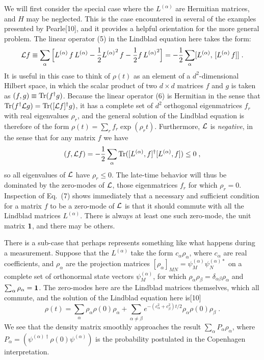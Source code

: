 We will first consider the special case where the $L^{(\alpha)}$ are Hermitian matrices, and $H$ may be neglected.  This is the case encountered in several of the examples presented by Pearle[10], and it provides a helpful orientation for the more general problem.  The linear operator (5) in the Lindblad equation here takes the form:
\begin{equation}
{\cal L}f\equiv \sum_\alpha \Big[L^{(\alpha)}\,f\,L^{(\alpha)}
-\frac{1}{2}{L^{(\alpha)}}^2\,f
-\frac{1}{2}f\,{L^{(\alpha)}}^2\Big]=-\frac{1}{2}\sum_\alpha[L^{(\alpha)},\,[L^{(\alpha)}\,f]]\;.
\end{equation}  
It is useful in this case to think of $ \rho(t)$ as an element of a $d^2$-dimensional Hilbert space, in which the scalar product of two $d\times d$ matrices $f$ and $g$ is taken as $(f,g)\equiv {\rm Tr}(f^\dagger g)$.  
Because the linear operator (6) is Hermitian in the sense that ${\rm Tr}(f^\dagger{\cal L} g)={\rm Tr}([{\cal L}f]^\dagger g)$, it has a complete set of $d^2$ orthogonal eigenmatrices $f_r$ with real eigenvalues $\rho_r$, and the general solution of the Lindblad equation is therefore of the form
$\rho(t)=\sum_r f_r\exp(\rho_r t)$.  Furthermore, ${\cal L}$ is {\em negative}, in the sense that for any matrix $f$ we have 
\begin{equation}
(f,{\cal L}f)=-\frac{1}{2}\sum_\alpha {\rm Tr}([L^{(\alpha)},f]^\dagger [L^{(\alpha)},f])\leq 0\;,
\end{equation}
so all eigenvalues of ${\cal L}$ have $\rho_r\leq 0$.  The late-time behavior will thus be dominated by the zero-modes of ${\cal L}$, those eigenmatrices $f_r$ for which $\rho_r=0$.  Inspection of Eq.~(7) shows immediately that a necessary and sufficient condition for a matrix $f$ to be a zero-mode of ${\cal L}$ is that it should commute with all the Lindblad matrices $L^{(\alpha)}$.  There is always at least one such zero-mode, the unit matrix $\mbox{\boldmath{$1$}}$, and there may be others.  






There is a sub-case  that perhaps represents something like what happens during a measurement.  Suppose that the $L^{(\alpha)}$ take the form $c_\alpha \rho_\alpha$, where $c_\alpha$ are  real coefficients, and $\rho_\alpha$ are the  projection matrices $[\rho_\alpha]_{MN}=\psi^{(\alpha)}_M \psi^{(\alpha)*}_N$ on a complete set of orthonormal state vectors $\psi^{(\alpha)}_M$, for which $\rho_\alpha\rho_\beta=\delta_{\alpha\beta}\rho_\alpha$ and $\sum_\alpha\rho_\alpha=\mbox{\boldmath{$1$}}$.    
The zero-modes here are the Lindblad matrices themselves, which all commute, and the solution of the Lindblad equation here is[10]
\begin{equation}
\rho(t)=\sum_\alpha \rho_\alpha\rho(0)\rho_\alpha+\sum_{\alpha\neq \beta}e^{-(c^2_\alpha+c^2_\beta)t/2}\rho_\alpha\rho(0)\rho_\beta\;.
\end{equation}
We see that the density matrix smoothly approaches the result $\sum_\alpha P_\alpha\rho_\alpha$, where $P_\alpha=(\psi^{(\alpha)\dagger}\rho(0)\psi^{(\alpha)})$ is the probability postulated in the Copenhagen interpretation.  

